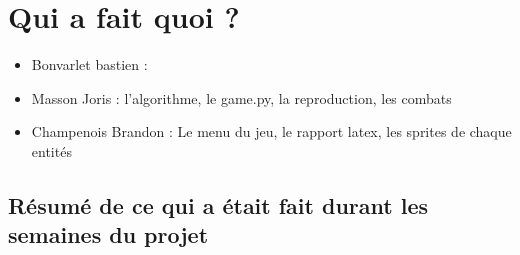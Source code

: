 \documentclass[a4paper, 11pt]{article}
\begin{document}
\section{Qui a fait quoi ?}

\begin{itemize}
\item Bonvarlet bastien :\\
\item Masson Joris : l'algorithme, le game.py, la reproduction, les combats\\
\item Champenois Brandon : Le menu du jeu, le rapport latex, les sprites de chaque entités
\end{itemize}

\subsection{Résumé de ce qui a était fait durant les semaines du projet}
\end{document}
